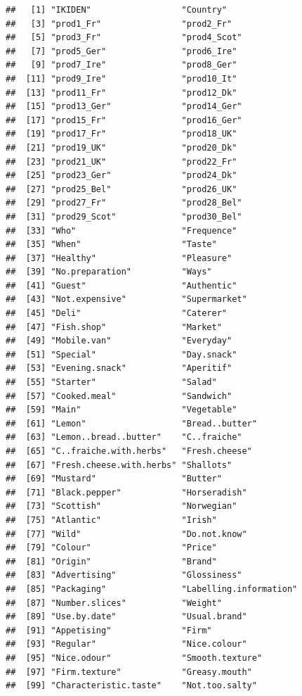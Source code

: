 \documentclass[
]{book}
\begin{document}
\begin{verbatim}
##   [1] "IKIDEN"                  "Country"                
##   [3] "prod1_Fr"                "prod2_Fr"               
##   [5] "prod3_Fr"                "prod4_Scot"             
##   [7] "prod5_Ger"               "prod6_Ire"              
##   [9] "prod7_Ire"               "prod8_Ger"              
##  [11] "prod9_Ire"               "prod10_It"              
##  [13] "prod11_Fr"               "prod12_Dk"              
##  [15] "prod13_Ger"              "prod14_Ger"             
##  [17] "prod15_Fr"               "prod16_Ger"             
##  [19] "prod17_Fr"               "prod18_UK"              
##  [21] "prod19_UK"               "prod20_Dk"              
##  [23] "prod21_UK"               "prod22_Fr"              
##  [25] "prod23_Ger"              "prod24_Dk"              
##  [27] "prod25_Bel"              "prod26_UK"              
##  [29] "prod27_Fr"               "prod28_Bel"             
##  [31] "prod29_Scot"             "prod30_Bel"             
##  [33] "Who"                     "Frequence"              
##  [35] "When"                    "Taste"                  
##  [37] "Healthy"                 "Pleasure"               
##  [39] "No.preparation"          "Ways"                   
##  [41] "Guest"                   "Authentic"              
##  [43] "Not.expensive"           "Supermarket"            
##  [45] "Deli"                    "Caterer"                
##  [47] "Fish.shop"               "Market"                 
##  [49] "Mobile.van"              "Everyday"               
##  [51] "Special"                 "Day.snack"              
##  [53] "Evening.snack"           "Aperitif"               
##  [55] "Starter"                 "Salad"                  
##  [57] "Cooked.meal"             "Sandwich"               
##  [59] "Main"                    "Vegetable"              
##  [61] "Lemon"                   "Bread..butter"          
##  [63] "Lemon..bread..butter"    "C..fraiche"             
##  [65] "C..fraiche.with.herbs"   "Fresh.cheese"           
##  [67] "Fresh.cheese.with.herbs" "Shallots"               
##  [69] "Mustard"                 "Butter"                 
##  [71] "Black.pepper"            "Horseradish"            
##  [73] "Scottish"                "Norwegian"              
##  [75] "Atlantic"                "Irish"                  
##  [77] "Wild"                    "Do.not.know"            
##  [79] "Colour"                  "Price"                  
##  [81] "Origin"                  "Brand"                  
##  [83] "Advertising"             "Glossiness"             
##  [85] "Packaging"               "Labelling.information"  
##  [87] "Number.slices"           "Weight"                 
##  [89] "Use.by.date"             "Usual.brand"            
##  [91] "Appetising"              "Firm"                   
##  [93] "Regular"                 "Nice.colour"            
##  [95] "Nice.odour"              "Smooth.texture"         
##  [97] "Firm.texture"            "Greasy.mouth"           
##  [99] "Characteristic.taste"    "Not.too.salty"
\end{verbatim}
\end{document}
